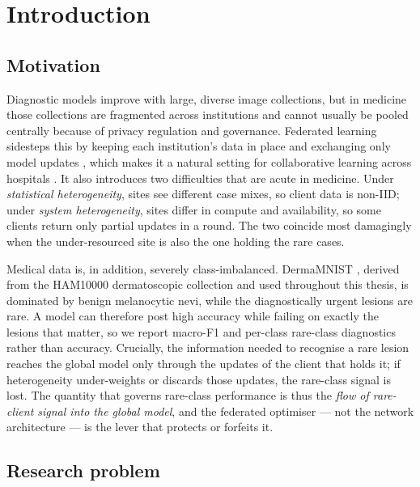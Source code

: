 \documentclass[11pt,a4paper]{report}
\begin{document}
\chapter{Introduction}
\label{ch:intro}

\section{Motivation}
\label{sec:intro-motivation}

Diagnostic models improve with large, diverse image collections, but in medicine
those collections are fragmented across institutions and cannot usually be pooled
centrally because of privacy regulation and governance. Federated learning
sidesteps this by keeping each institution's data in place and exchanging only
model updates \citep{mcmahan2017fedavg, rieke2020future, sheller2020medicalfl},
which makes it a natural setting for collaborative learning across hospitals
\citep{kairouz2021advances}. It also introduces two difficulties that are acute
in medicine. Under \emph{statistical heterogeneity}, sites see different case
mixes, so client data is non-IID; under \emph{system heterogeneity}, sites differ
in compute and availability, so some clients return only partial updates in a
round. The two coincide most damagingly when the under-resourced site is also the
one holding the rare cases.

Medical data is, in addition, severely class-imbalanced. DermaMNIST
\citep{yang2023medmnistv2}, derived from the HAM10000 dermatoscopic collection
\citep{tschandl2018ham10000} and used throughout this thesis, is dominated by
benign melanocytic nevi, while the diagnostically urgent lesions are rare. A model
can therefore post high accuracy while failing on exactly the lesions that matter,
so we report macro-F1 and per-class rare-class diagnostics rather than accuracy.
Crucially, the information needed to recognise a rare lesion reaches the global
model only through the updates of the client that holds it; if heterogeneity
under-weights or discards those updates, the rare-class signal is lost. The
quantity that governs rare-class performance is thus the \emph{flow of
rare-client signal into the global model}, and the federated optimiser --- not the
network architecture --- is the lever that protects or forfeits it.

\section{Research problem}
\label{sec:intro-problem}
\end{document}
